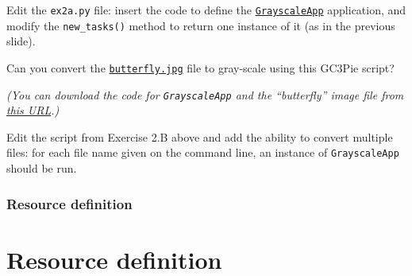 \documentclass[english,serif,mathserif,xcolor=pdftex,dvipsnames,table]{beamer}
\begin{document}
\begin{frame}[fragile]
  \small

  \begin{exercise*}[2.B]

    \+
    Edit the \texttt{ex2a.py} file: insert the code to define the
    \href{https://raw.githubusercontent.com/uzh/gc3pie/training-july-2016/docs/programmers/tutorials/workflows/downloads/grayscale_app.py}{\texttt{GrayscaleApp}}
    application, and modify the \texttt{new\_tasks()} method to return
    one instance of it (as in the previous slide).

    \+
    Can you convert the \href{https://raw.githubusercontent.com/uzh/gc3pie/training-july-2016/docs/programmers/tutorials/workflows/butterfly.jpg}{\texttt{butterfly.jpg}} file to gray-scale using
    this GC3Pie script?

    \+ \footnotesize
    {\em (You can download the code for \texttt{GrayscaleApp} and the ``butterfly'' image file from
    \href{https://raw.githubusercontent.com/uzh/gc3pie/training-july-2016/docs/programmers/tutorials/workflows/}{this
      URL}.)}
  \end{exercise*}

  \+
  \begin{exercise*}[2.C]

    Edit the script from Exercise 2.B above and add the ability to
    convert multiple files: for each file name given on the command
    line, an instance of \texttt{GrayscaleApp} should be run.
  \end{exercise*}
\end{frame}


\section{Resource definition}
\part{Resource definition}
\end{document}
